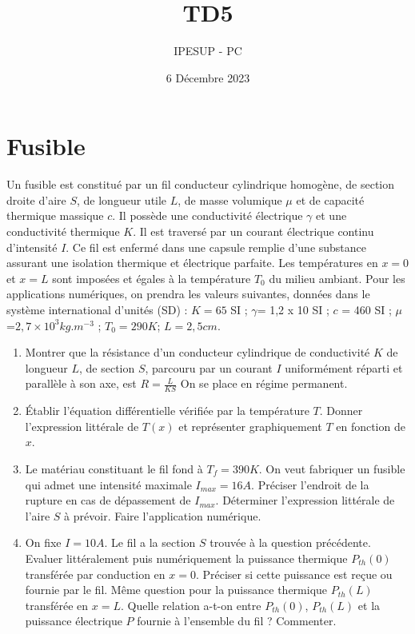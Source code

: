 \documentclass{article}
\title{TD5}
\author{IPESUP - PC }
\date{6 Décembre 2023}
\begin{document}
\maketitle



\section{Fusible}

Un fusible est constitué par un fil conducteur cylindrique homogène, de section droite d’aire
$S$, de longueur utile $ L$, de masse volumique $\mu$ et de capacité thermique massique $c$. Il possède
une conductivité électrique $\gamma$ et une conductivité thermique $K$. Il est traversé par un courant
électrique continu d’intensité $I$. Ce fil est enfermé dans une capsule remplie d’une substance
assurant une isolation thermique et électrique parfaite. Les températures en $x =0 $ et $ x =L$
sont imposées et égales à la température $T_0$ du milieu ambiant.
Pour les applications numériques, on prendra les valeurs suivantes, données dans le système
international d’unités (SD) : $K = 65$ SI ; $\gamma$= 1,2 x 10 SI ; $c$ = 460 SI ; $\mu$ =$ 2,7 \times 10^3 kg.m^{-3}$ ;
$T_0 =290 K$; $L=2,5 cm$. 

\begin{enumerate}
    \item Montrer que la résistance d'un   conducteur cylindrique de conductivité $K$ de longueur
$L$, de section $S$, parcouru par un courant $I$ uniformément réparti et parallèle à son axe, est
$R=\frac{L}{K S}$ On se place en régime permanent. 
\item Établir l’équation différentielle vérifiée par la température $T$. Donner l’expression littérale
de $T(x)$ et représenter graphiquement $T$ en fonction de $x$. 
\item Le matériau constituant le fil fond à $T_f = 390 K$. On veut fabriquer un fusible qui admet
une intensité maximale $I_{max} = 16 A$.
Préciser l’endroit de la rupture en cas de dépassement de $I_{max}$. Déterminer l’expression littérale de l’aire $S$ à prévoir. Faire l’application numérique. 
\item  On fixe $ I = 10 A$. Le fil a la section $S$ trouvée à la question précédente. Evaluer littéralement puis numériquement la puissance thermique $P_{th}(0)$ transférée par conduction en $x= 0$.
Préciser si cette puissance est reçue ou fournie par le fil. Même question pour la puissance
thermique $P_{th}(L)$ transférée en $x = L$. Quelle relation a-t-on entre $P_{th}(0)$, $P_{th}(L)$ et la puissance
électrique $P$ fournie à l’ensemble du fil ? Commenter. 

\end{enumerate}
\end{document}
